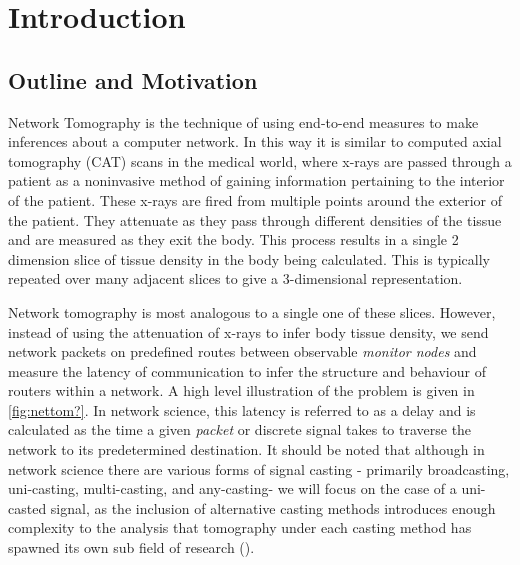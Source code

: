 \chapter{Introduction}
\label{cha:intro}

\section{Outline and Motivation}
\label{sec:Imotivationandoutline}

Network Tomography is the technique of using end-to-end measures to make inferences about a computer network. In this way it is similar to computed axial tomography (CAT) scans in the medical world, where x-rays are passed through a patient as a noninvasive method of gaining information pertaining to the interior of the patient. These x-rays are fired from multiple points around the exterior of the patient. They attenuate as they pass through different densities of the tissue and are measured as they exit the body. This process results in a single 2 dimension slice of tissue density in the body being calculated. This is typically repeated over many adjacent slices to give a 3-dimensional representation.\par
Network tomography is most analogous to a single one of these slices. However, instead of using the attenuation of x-rays to infer body tissue density, we send network packets on predefined routes between observable \textit{monitor nodes} and measure the latency of communication to infer the structure and behaviour of routers within a network. A high level illustration of the problem is given in \ref{fig:nettom?}. In network science, this latency is referred to as a delay and is calculated as the time a given \textit{packet} or discrete signal takes to traverse the network to its predetermined destination. It should be noted that although in network science there are various forms of signal casting - primarily broadcasting, uni-casting, multi-casting, and any-casting- we will focus on the case of a uni-casted signal, as the inclusion of alternative casting methods introduces enough complexity to the analysis that tomography under each casting method has spawned its own sub field of research (\cite{lawrence_network_2006}).\par
